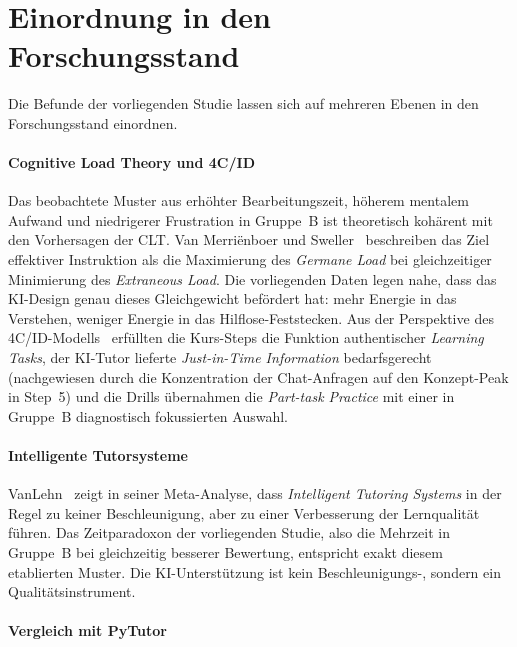 \section{Einordnung in den Forschungsstand}\label{sec:einordnung}

Die Befunde der vorliegenden Studie lassen sich auf mehreren Ebenen in den Forschungsstand einordnen.

\paragraph{Cognitive Load Theory und 4C/ID}

Das beobachtete Muster aus erhöhter Bearbeitungszeit, höherem mentalem Aufwand und niedrigerer Frustration in Gruppe~B ist theoretisch kohärent mit den Vorhersagen der CLT. Van Merriënboer und Sweller~\cite{sweller1998} beschreiben das Ziel effektiver Instruktion als die Maximierung des \textit{Germane Load} bei gleichzeitiger Minimierung des \textit{Extraneous Load}. Die vorliegenden Daten legen nahe, dass das KI-Design genau dieses Gleichgewicht befördert hat: mehr Energie in das Verstehen, weniger Energie in das Hilflose-Feststecken. Aus der Perspektive des 4C/ID-Modells~\cite{vanmerrienboer2018} erfüllten die Kurs-Steps die Funktion authentischer \textit{Learning Tasks}, der KI-Tutor lieferte \textit{Just-in-Time Information} bedarfsgerecht (nachgewiesen durch die Konzentration der Chat-Anfragen auf den Konzept-Peak in Step~5) und die Drills übernahmen die \textit{Part-task Practice} mit einer in Gruppe~B diagnostisch fokussierten Auswahl.

\paragraph{Intelligente Tutorsysteme}

VanLehn~\cite{vanlehn2011} zeigt in seiner Meta-Analyse, dass \textit{Intelligent Tutoring Systems} in der Regel zu keiner Beschleunigung, aber zu einer Verbesserung der Lernqualität führen. Das Zeitparadoxon der vorliegenden Studie, also die Mehrzeit in Gruppe~B bei gleichzeitig besserer Bewertung, entspricht exakt diesem etablierten Muster. Die KI-Unterstützung ist kein Beschleunigungs-, sondern ein Qualitätsinstrument.

\paragraph{Vergleich mit PyTutor}

